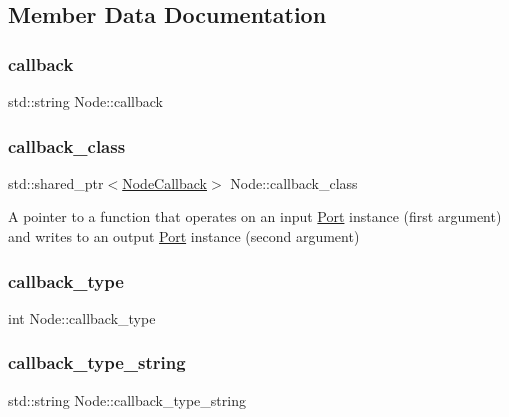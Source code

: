 \subsection{Member Data Documentation}
\mbox{\label{class_node_a3755609fd44cf5b86c8a7d1f94d9747b}} 
\subsubsection{\texorpdfstring{callback}{callback}}
{\footnotesize\ttfamily std\+::string Node\+::callback\hspace{0.3cm}{\ttfamily [protected]}}

\mbox{\label{class_node_a9bc5e92a6565a4addbbcadea93889e85}} 
\subsubsection{\texorpdfstring{callback\+\_\+class}{callback\_class}}
{\footnotesize\ttfamily std\+::shared\+\_\+ptr$<$\hyperlink{class_node_callback}{Node\+Callback}$>$ Node\+::callback\+\_\+class}

A pointer to a function that operates on an input \hyperlink{class_port}{Port} instance (first argument) and writes to an output \hyperlink{class_port}{Port} instance (second argument) \mbox{\label{class_node_a290c95a63ae639d150355764ea1f4b54}} 
\subsubsection{\texorpdfstring{callback\+\_\+type}{callback\_type}}
{\footnotesize\ttfamily int Node\+::callback\+\_\+type\hspace{0.3cm}{\ttfamily [protected]}}

\mbox{\label{class_node_aa6465260fcaaecbb7bc8847dbbeb3ba6}} 
\subsubsection{\texorpdfstring{callback\+\_\+type\+\_\+string}{callback\_type\_string}}
{\footnotesize\ttfamily std\+::string Node\+::callback\+\_\+type\+\_\+string\hspace{0.3cm}{\ttfamily [protected]}}

